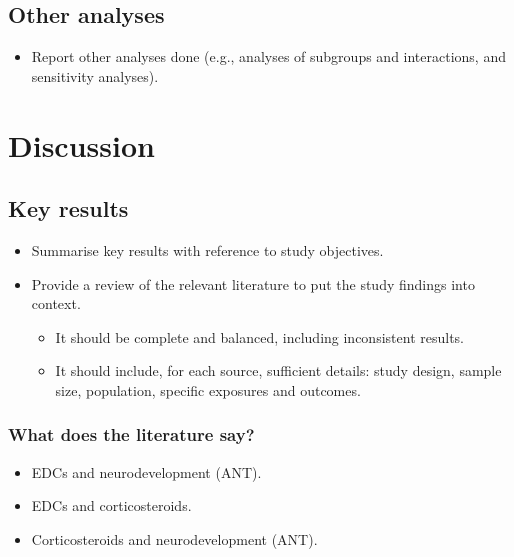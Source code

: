 \documentclass[
  letterpaper,
  DIV=11,
  numbers=noendperiod]{scrartcl}
\providecommand{\tightlist}{%
  \setlength{\itemsep}{0pt}\setlength{\parskip}{0pt}}\usepackage{longtable,booktabs,array}
\begin{document}
\subsection{Other analyses}\label{sec-res-other}

\begin{itemize}
\tightlist
\item
  Report other analyses done (e.g., analyses of subgroups and
  interactions, and sensitivity analyses).
\end{itemize}

\section{Discussion}\label{sec-discussion}

\subsection{Key results}\label{sec-disc-res-key}

\begin{itemize}
\tightlist
\item
  Summarise key results with reference to study objectives.
\item
  Provide a review of the relevant literature to put the study findings
  into context.

  \begin{itemize}
  \tightlist
  \item
    It should be complete and balanced, including inconsistent results.
  \item
    It should include, for each source, sufficient details: study
    design, sample size, population, specific exposures and outcomes.
  \end{itemize}
\end{itemize}

\subsubsection{What does the literature
say?}\label{what-does-the-literature-say}

\begin{itemize}
\tightlist
\item
  EDCs and neurodevelopment (ANT).
\item
  EDCs and corticosteroids.
\item
  Corticosteroids and neurodevelopment (ANT).
\end{itemize}
\end{document}
